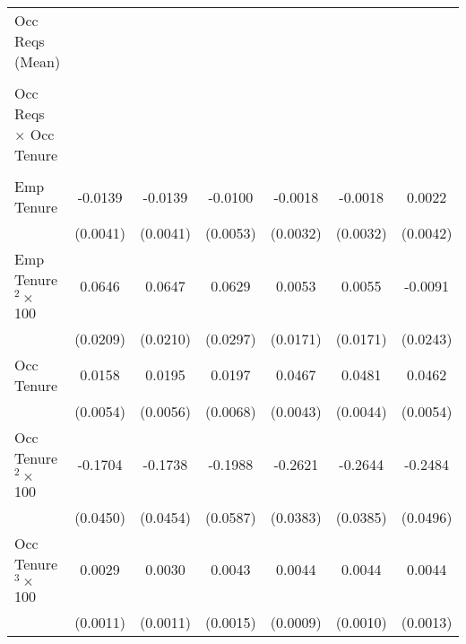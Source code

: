 {\begin{longtable}{l*{6}{c}}
Occ Reqs (Mean)     &                     &                     &                     &                     &                     &                     \\
                    &                     &                     &                     &                     &                     &                     \\
Occ Reqs $\times$ Occ Tenure&                     &                     &                     &                     &                     &                     \\
                    &                     &                     &                     &                     &                     &                     \\
Emp Tenure          &     -0.0139\sym{***}&     -0.0139\sym{***}&     -0.0100\sym{*}  &     -0.0018         &     -0.0018         &      0.0022         \\
                    &    (0.0041)         &    (0.0041)         &    (0.0053)         &    (0.0032)         &    (0.0032)         &    (0.0042)         \\
Emp Tenure$^2\times$ 100&      0.0646\sym{***}&      0.0647\sym{***}&      0.0629\sym{**} &      0.0053         &      0.0055         &     -0.0091         \\
                    &    (0.0209)         &    (0.0210)         &    (0.0297)         &    (0.0171)         &    (0.0171)         &    (0.0243)         \\
Occ Tenure          &      0.0158\sym{***}&      0.0195\sym{***}&      0.0197\sym{***}&      0.0467\sym{***}&      0.0481\sym{***}&      0.0462\sym{***}\\
                    &    (0.0054)         &    (0.0056)         &    (0.0068)         &    (0.0043)         &    (0.0044)         &    (0.0054)         \\
Occ Tenure$^2\times$ 100&     -0.1704\sym{***}&     -0.1738\sym{***}&     -0.1988\sym{***}&     -0.2621\sym{***}&     -0.2644\sym{***}&     -0.2484\sym{***}\\
                    &    (0.0450)         &    (0.0454)         &    (0.0587)         &    (0.0383)         &    (0.0385)         &    (0.0496)         \\
Occ Tenure$^3\times$ 100&      0.0029\sym{***}&      0.0030\sym{***}&      0.0043\sym{***}&      0.0044\sym{***}&      0.0044\sym{***}&      0.0044\sym{***}\\
                    &    (0.0011)         &    (0.0011)         &    (0.0015)         &    (0.0009)         &    (0.0010)         &    (0.0013)         \\

\end{longtable}}
